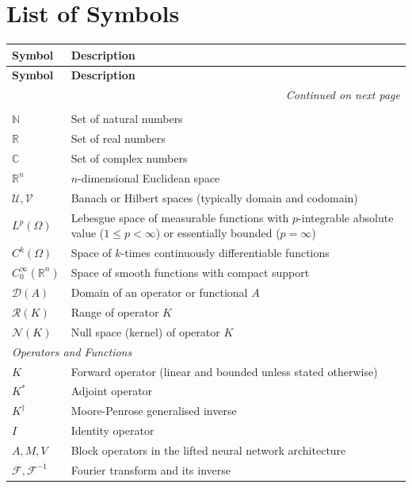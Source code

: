 \chapter*{List of Symbols}

\renewcommand{\arraystretch}{1.2}
\begin{longtable}{p{3cm} p{10cm}}
\textbf{Symbol} & \textbf{Description} \\
\hline
\endfirsthead
\textbf{Symbol} & \textbf{Description} \\
\hline
\endhead
\hline
\multicolumn{2}{r}{\textit{Continued on next page}} \\
\endfoot
\endlastfoot

\multicolumn{2}{l}{\textit{Spaces and Sets}} \\
$\mathbb{N}$ & Set of natural numbers \\
$\mathbb{R}$ & Set of real numbers \\
$\mathbb{C}$ & Set of complex numbers \\
$\mathbb{R}^n$ & $n$-dimensional Euclidean space \\
$\mathcal{U}, \mathcal{V}$ & Banach or Hilbert spaces (typically domain and codomain) \\
$L^p(\Omega)$ & Lebesgue space of measurable functions with $p$-integrable absolute value ($1 \le p < \infty$) or essentially bounded ($p=\infty$) \\
$C^k(\Omega)$ & Space of $k$-times continuously differentiable functions \\
$C^\infty_0(\mathbb{R}^n)$ & Space of smooth functions with compact support \\
$\mathcal{D}(A)$ & Domain of an operator or functional $A$ \\
$\mathcal{R}(K)$ & Range of operator $K$ \\
$\mathcal{N}(K)$ & Null space (kernel) of operator $K$ \\
\hline
\multicolumn{2}{l}{\textit{Operators and Functions}} \\
$K$ & Forward operator (linear and bounded unless stated otherwise) \\
$K^*$ & Adjoint operator \\
$K^\dagger$ & Moore-Penrose generalised inverse \\
$I$ & Identity operator \\
$A, M, V$ & Block operators in the lifted neural network architecture \\
$\mathcal{F}, \mathcal{F}^{-1}$ & Fourier transform and its inverse \\

\end{longtable}
